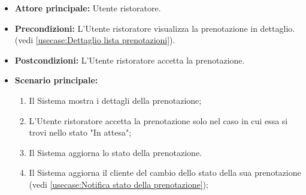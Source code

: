 \label{usecase:Accetta prenotazione}
\begin{itemize}
	\item \textbf{Attore principale:} Utente ristoratore.

	\item \textbf{Precondizioni:} L'Utente ristoratore visualizza la prenotazione in dettaglio. (vedi \autoref{usecase:Dettaglio lista prenotazioni}).

	\item \textbf{Postcondizioni:} L'Utente ristoratore accetta la prenotazione.


	\item \textbf{Scenario principale:}
	      \begin{enumerate}
		      \item Il Sistema mostra i dettagli della prenotazione;
		      \item L'Utente ristoratore accetta la prenotazione solo nel caso in cui essa si trovi nello stato "In attesa";
		      \item Il Sistema aggiorna lo stato della prenotazione.
		      \item Il Sistema aggiorna il cliente del cambio dello stato della sua prenotazione (vedi \autoref{usecase:Notifica stato della prenotazione});

	      \end{enumerate}
\end{itemize}
